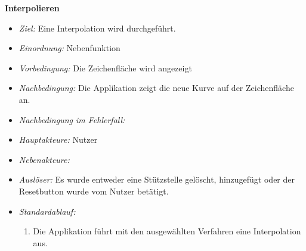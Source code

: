 \textbf{Interpolieren}
  \begin{itemize}
  \item \textit{Ziel:} Eine Interpolation  wird durchgef\"uhrt.  
  \item \textit{Einordnung:} Nebenfunktion
  \item \textit{Vorbedingung:} Die Zeichenfl\"ache wird angezeigt
  \item \textit{Nachbedingung:} Die Applikation zeigt die neue Kurve auf der Zeichenfl\"ache an.
  \item \textit{Nachbedingung im Fehlerfall:} 
  \item \textit{Hauptakteure:} Nutzer
  \item \textit{Nebenakteure:} 
  \item \textit{Ausl\"oser:} Es wurde entweder eine St\"utzstelle gel\"oscht, hinzugef\"ugt oder der Resetbutton wurde vom Nutzer bet\"atigt.
  \item \textit{Standardablauf:}
    \begin{enumerate}[label=(\arabic*)]
\item Die Applikation f\"uhrt mit den ausgew\"ahlten Verfahren eine Interpolation aus.
\end{enumerate}
  \end{itemize}